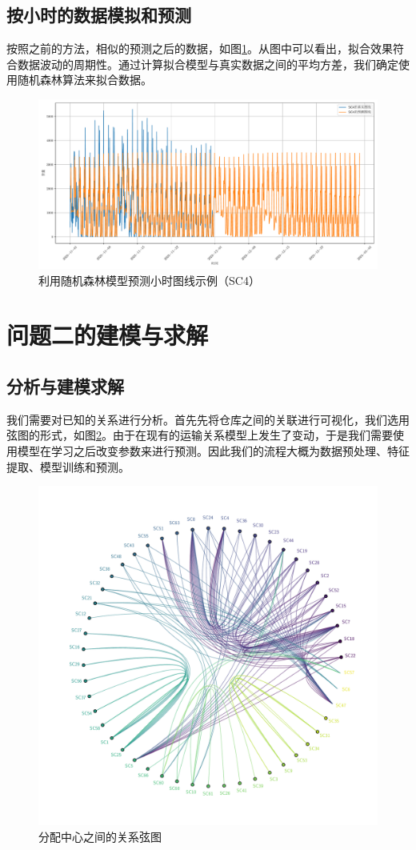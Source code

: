 \documentclass[UTF8]{article}%
\begin{document}
\subsection{按小时的数据模拟和预测}
按照之前的方法，相似的预测之后的数据，如图\ref{SC4_2}。从图中可以看出，拟合效果符合数据波动的周期性。通过计算拟合模型与真实数据之间的平均方差，我们确定使用随机森林算法来拟合数据。

\begin{figure}[!ht]
	\centering
	\includegraphics*[width=0.9\linewidth]{images/SC_4_2.pdf}
	\caption{利用随机森林模型预测小时图线示例（SC4）}
	\label{SC4_2}
\end{figure}

\clearpage
\section{问题二的建模与求解}
\subsection{分析与建模求解}
我们需要对已知的关系进行分析。首先先将仓库之间的关联进行可视化，我们选用弦图的形式，如图\ref{xt}。由于在现有的运输关系模型上发生了变动，于是我们需要使用模型在学习之后改变参数来进行预测。因此我们的流程大概为数据预处理、特征提取、模型训练和预测。
\begin{figure}[!ht]
	\centering
	\includegraphics*[width=0.8\linewidth]{images/xuantu.pdf}
	\caption{分配中心之间的关系弦图}
	\label{xt}
\end{figure}
\end{document}
